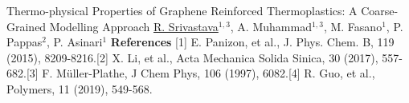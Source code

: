 \begin{abstract_online}{Thermo-physical Properties of Graphene Reinforced Thermoplastics: A Coarse- Grained Modelling Approach}{%
        \underline{R. Srivastava}$^{1, 3}$, A. Muhammad$^{1, 3}$, M. Fasano$^{1}$, P. Pappas$^{2}$, P. Asinari$^{1}$}{%
        \IStag}
        \textbf{References} \newline{}[1] E. Panizon, et al., J. Phys. Chem. B, 119 (2015), 8209-8216.\newline{}[2] X. Li, et al., Acta Mechanica Solida Sinica, 30 (2017), 557-682.\newline{}[3] F. Müller-Plathe, J Chem Phys, 106 (1997), 6082.\newline{}[4] R. Guo, et al., Polymers, 11 (2019), 549-568.
    \end{abstract_online}
    